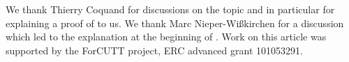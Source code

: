 We thank Thierry Coquand for discussions on the topic and in particular for explaining a proof of  to us.
We thank Marc Nieper-Wißkirchen for a discussion which led to the explanation at the beginning of .
Work on this article was supported by the ForCUTT project, ERC advanced grant 101053291.